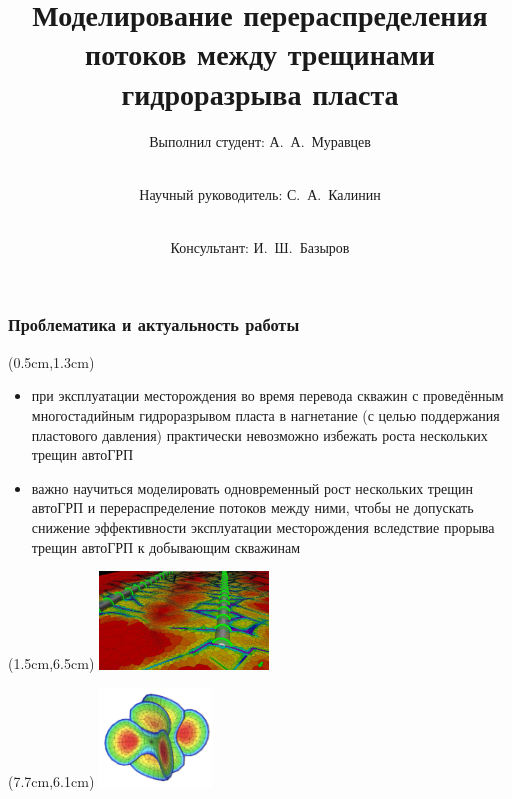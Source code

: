 \documentclass{beamer}
\title{Моделирование перераспределения потоков между трещинами гидроразрыва пласта}
\subtitle{}
\author{Выполнил студент: А.~А.~Муравцев\and \\Научный руководитель: С.~А.~Калинин\and \\Консультант: И.~Ш.~Базыров}
\begin{document}
\begin{frame}
\titlepage
\end{frame}


\begin{frame}
\frametitle{Проблематика и актуальность работы}

\begin{textblock*}{10.5cm}(0.5cm,1.3cm)
\begin{itemize}
	\item при эксплуатации месторождения во время перевода скважин с проведённым многостадийным гидроразрывом пласта в нагнетание (с целью поддержания пластового давления) практически невозможно избежать роста нескольких трещин автоГРП
	\item важно научиться моделировать одновременный рост нескольких трещин автоГРП и перераспределение потоков между ними, чтобы не допускать снижение эффективности эксплуатации месторождения вследствие прорыва трещин автоГРП к добывающим скважинам 
\end{itemize}
\end{textblock*}

\begin{textblock*}{4.5cm}(1.5cm,6.5cm)
\includegraphics[width=4.5cm]{hydraulic_fracturing_abstract_image1.jpeg}
\end{textblock*}

\begin{textblock*}{4cm}(7.7cm,6.1cm)
\includegraphics[width=3cm]{hydraulic_fracturing_abstract_image2.jpg}
\end{textblock*}

\end{frame}
\end{document}
